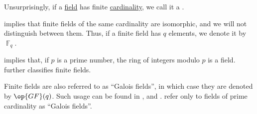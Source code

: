 \begin{definition}\label{def:finite_field}\mimprovised
  Unsurprisingly, if a \hyperref[def:field]{field} has finite \hyperref[def:cardinality]{cardinality}, we call it a .

   implies that finite fields of the same cardinality are isomorphic, and we will not distinguish between them. Thus, if a finite field has \( q \) elements, we denote it by \( \BbbF_q \).
\end{definition}
\begin{comments}
  \item {} implies that, if \( p \) is a prime number, the ring of integers modulo \( p \) is a field.  further classifies finite fields.

  \item Finite fields are also referred to as \enquote{Galois fields}, in which case they are denoted by \( \op{GF}(q) \). Such usage can be found in \cite[104]{Berlekamp2015AlgebraicCodingTheory}, \textcite[153]{Hall1986CombinatorialTheory} and \textcite[163]{Кострикин2020АлгебраЧасть1}. \Textcite[def. 1.41]{LidlNiederreiter1997FiniteFields} refer only to fields of prime cardinality as \enquote{Galois fields}.
\end{comments}

